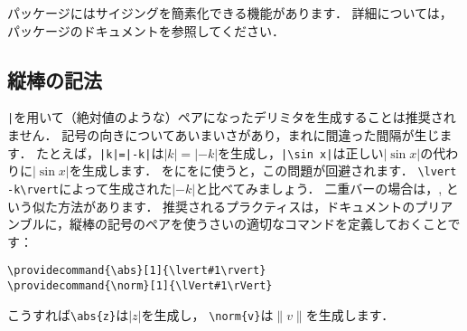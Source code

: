 パッケージにはサイジングを簡素化できる機能があります．
詳細については，パッケージのドキュメントを参照してください．

\subsection{縦棒の記法}\label{verts}

\verb'|'を用いて（絶対値のような）ペアになったデリミタを生成することは推奨されません．
記号の向きについてあいまいさがあり，まれに間違った間隔が生じます．
たとえば，\verb'|k|=|-k|'は$|k|=|-k|$を生成し，\verb'|\sin x|'は正しい$\lvert\sin x\rvert $の代わりに$|\sin x|$を生成します．
をにをに使うと，この問題が回避されます．
\verb'\lvert -k\rvert'によって生成された$\lvert -k\rvert$と比べてみましょう．
二重バーの場合は，, という似た方法があります．
推奨されるプラクティスは，ドキュメントのプリアンブルに，縦棒の記号のペアを使うさいの適切なコマンドを定義しておくことです：
\begin{verbatim}
\providecommand{\abs}[1]{\lvert#1\rvert}
\providecommand{\norm}[1]{\lVert#1\rVert}
\end{verbatim}
こうすれば\verb|\abs{z}|は$\lvert z\rvert$を生成し，
\verb|\norm{v}|は$\lVert v\rVert$を生成します．

